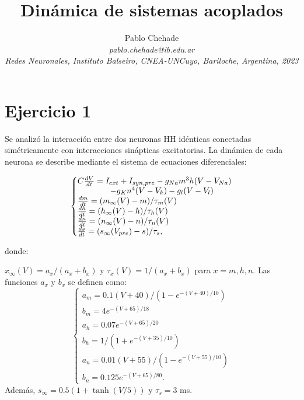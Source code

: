 \documentclass[aps,prb,twocolumn,superscriptaddress,floatfix,longbibliography]{revtex4-2}
\newcounter{para}
\begin{document}
\newcommand{\mytitle}{Dinámica de sistemas acoplados}

\title{\mytitle}

\author{Pablo Chehade \\
    \small \textit{pablo.chehade@ib.edu.ar} \\
    \small \textit{Redes Neuronales, Instituto Balseiro, CNEA-UNCuyo, Bariloche, Argentina, 2023} \\}
    
    
    
\maketitle



\section{Ejercicio 1}
Se analizó la interacción entre dos neuronas HH idénticas conectadas simétricamente con interacciones sinápticas excitatorias. La dinámica de cada neurona se describe mediante el sistema de ecuaciones diferenciales:

\[
\left\{\begin{array}{@{}l@{}}
    C \frac{dV}{dt} = I_{ext} + I_{syn,pre} - g_{Na}m^3h(V-V_{Na}) \\ 
    \hspace{4em} - g_{K}n^4(V - V_k) - g_l(V-V_l)    \\
    \frac{dm}{dt} = (m_\infty(V) - m)/\tau_m(V)    \\
    \frac{dh}{dt} = (h_\infty(V) - h)/\tau_h(V)    \\
    \frac{dn}{dt} = (n_\infty(V) - n)/\tau_n(V)    \\
    \frac{ds}{dt} = (s_\infty(V_{pre}) - s)/\tau_s,
    \end{array}\right.
\]

donde:

$x_\infty(V) = a_x/(a_x + b_x)$ y $\tau_x(V) = 1/(a_x + b_x)$ para $x = m, h, n$. Las funciones $a_x$ y $b_x$ se definen como:
\[
\left\{\begin{matrix}
    a_m = 0.1(V + 40)/(1 - e^{-(V+40)/10}) \\
    b_m = 4 e^{- (V + 65)/18}    \\
    a_h = 0.07 e^{- (V+65)/20} \\ 
    b_h = 1/(1 + e^{- (V+35)/10})    \\
    a_n = 0.01(V+55)/(1-e^{-(V+55)/10}) \\
    b_n = 0.125 e^{-(V+65)/80}.
    \end{matrix}\right.
\]
Además, $s_\infty = 0.5 (1 + \tanh(V/5))$ y $\tau_s = 3$ ms.
\end{document}
